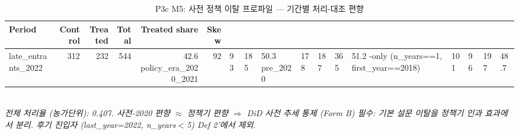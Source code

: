 \begin{table}[t]
\centering
\caption{P3c M5: 사전 정책 이탈 프로파일 — 기간별 처리-대조 편향}
\label{tab:ch5_attrition_profile_ko}
\begin{tabular}{lrrrrr}
\toprule
Period & Control & Treated & Total & Treated share & Skew \\
\midrule
late\_entrants\_2022 & 312 & 232 & 544 & 42.6%
policy\_era\_2020\_2021 & 92 & 93 & 185 & 50.3%
pre\_2020 & 178 & 187 & 365 & 51.2%
-only (n\_years==1, first\_year==2018) & 101 & 96 & 197 & 48.7%
\bottomrule
\end{tabular}\\
\footnotesize\textit{전체 처리율 (농가단위): 0.407. 사전-2020 편향 $\approx$ 정책기 편향 $\Rightarrow$ DiD 사전 추세 통제 (Form B) 필수: 기본 설문 이탈을 정책기 인과 효과에서 분리. 후기 진입자 (last\_year=2022, n\_years$<$5) Def 2'에서 제외.}
\end{table}

